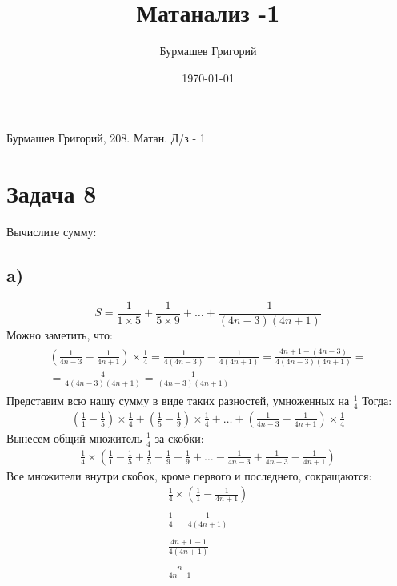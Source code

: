 \documentclass[a4p aper,12pt]{article}
\author{Бурмашев Григорий}
\title{Матанализ  -1}
\date{\today}
\begin{document}
\begin{center}
Бурмашев Григорий, 208. Матан. Д/з - 1
\end{center}
\section{Задача 8}
Вычислите сумму:
\subsection*{a)}
\[S = \frac{1}{1\times5} + \frac{1}{5\times9} + \ldots + \frac{1}{(4n-3)(4n+1)}\]
Можно заметить, что:\\
\begin{eqnarray*}
\begin{gathered}
\left(\frac{1}{4n-3} - \frac{1}{4n+1}\right)\times \frac{1}{4} = \frac{1}{4(4n-3)} - \frac{1}{4(4n+1)} = \frac{4n+1 - (4n-3)}{4(4n-3)(4n+1)} =\\ = \frac{4}{4(4n-3)(4n+1)} = \frac{1}{(4n-3)(4n+1)}
\end{gathered}
\end{eqnarray*}
Представим всю нашу сумму в виде таких разностей, умноженных на $\frac{1}{4}$
Тогда:
\begin{equation*}
\begin{gathered}
(\frac{1}{1} - \frac{1}{5}) \times \frac{1}{4} + (\frac{1}{5} - \frac{1}{9}) \times \frac{1}{4} + \ldots + (\frac{1}{4n-3} - \frac{1}{4n+1}) \times \frac{1}{4}
\end{gathered}
\end{equation*}
Вынесем общий множитель $\frac{1}{4}$ за скобки:
\begin{equation*}
\begin{gathered}
\frac{1}{4} \times \left(\frac{1}{1}- \frac{1}{5} + \frac{1}{5} - \frac{1}{9} + \frac{1}{9}  +\ldots- \frac{1}{4n-3} +\frac{1}{4n-3} - \frac{1}{4n+1}\right)
\end{gathered}
\end{equation*}
Все множители внутри скобок, кроме первого и последнего, сокращаются:
\begin{equation*}
\begin{gathered}
\frac{1}{4} \times \left(\frac{1}{1} -\frac{1}{4n+1}\right)\\\\
\frac{1}{4} -\frac{1}{4(4n+1)}\\\\
\frac{4n+1-1}{4(4n+1)}\\\\
\frac{n}{4n+1}
\end{gathered}
\end{equation*}
\end{document}
